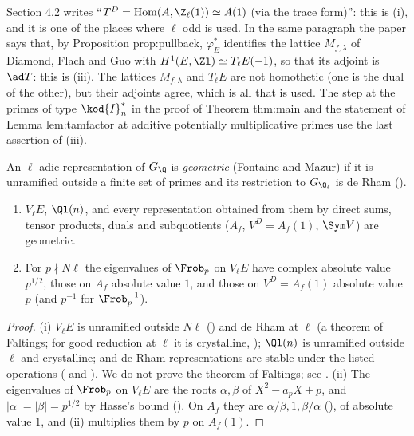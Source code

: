 \begin{paperlink}
Section 4.2 writes ``$T^D=\operatorname{Hom}(A,\Z_\ell(1))\simeq A(1)$ (via the trace form)'': this is (i), and it is one of the places where $\ell$ odd is
used. In the same paragraph the paper says that, by Proposition prop:pullback, $\varphi_E^*$ identifies the lattice $M_{f,\lambda}$ of Diamond,
Flach and Guo with $H^1(E,\Zl)\simeq T_\ell E(-1)$, so that its adjoint is $\ad T$: this is (iii). The lattices $M_{f,\lambda}$ and $T_\ell E$ are not
homothetic (one is the dual of the other), but their adjoints agree, which is all that is used. The step at the primes of type
$\kod{I}_n^*$ in the proof of Theorem thm:main and the statement of Lemma lem:tamfactor at additive potentially multiplicative primes use the
last assertion of (iii).
\end{paperlink}

\begin{definition}\label{def:blochkato:geometric}
An $\ell$-adic representation of $G_\Q$ is \emph{geometric} (Fontaine and Mazur) if it is unramified outside a finite set of primes and its restriction
to $G_{\Q_\ell}$ is de Rham ().
\end{definition}

\begin{proposition}\label{prop:blochkato:purity}
\begin{enumerate}[label=(\roman*)]
\item $V_\ell E$, $\Ql(n)$, and every representation obtained from them by direct sums, tensor products, duals and subquotients ($A_f$, $V^D=A_f(1)$,
$\Sym V$) are geometric.
\item For $p\nmid N\ell$ the eigenvalues of $\Frob_p$ on $V_\ell E$ have complex absolute value $p^{1/2}$, those on $A_f$ absolute value $1$, and those on
$V^D=A_f(1)$ absolute value $p$ (and $p^{-1}$ for $\Frob_p^{-1}$).
\end{enumerate}
\end{proposition}

\begin{proof}
(i) $V_\ell E$ is unramified outside $N\ell$ () and de Rham at $\ell$ (a theorem of Faltings; for good reduction at $\ell$ it is crystalline,
); $\Ql(n)$ is unramified outside $\ell$ and crystalline; and de Rham representations are stable under the
listed operations ( and \cite{Berger}). We do not prove the theorem of Faltings; see \cite{Berger}. (ii) The
eigenvalues of $\Frob_p$ on $V_\ell E$ are the roots $\alpha,\beta$ of $X^2-a_pX+p$, and $|\alpha|=|\beta|=p^{1/2}$ by Hasse's bound (). On $A_f$ they
are $\alpha/\beta,1,\beta/\alpha$ (), of absolute value $1$, and (ii) multiplies them by $p$ on $A_f(1)$.
\end{proof}

